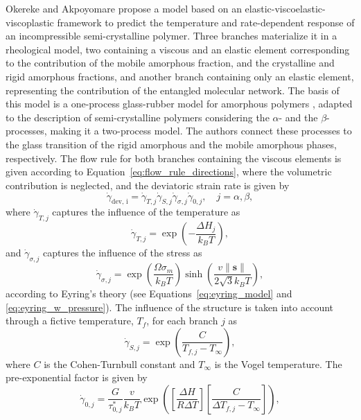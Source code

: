Okereke and Akpoyomare \citep{okerekeTwoprocessConstitutiveModel2019} propose a model based on an elastic-viscoelastic-viscoplastic framework to predict the temperature and rate-dependent response of an incompressible semi-crystalline polymer.
Three branches materialize it in a rheological model, two containing a viscous and an elastic element corresponding to the contribution of the mobile amorphous fraction, and the crystalline and rigid amorphous fractions, and another branch containing only an elastic element, representing the contribution of the entangled molecular network.
The basis of this model is a one-process glass-rubber model for amorphous polymers \citep{buckleyGlassrubberConstitutiveModel1995}, adapted to the description of semi-crystalline polymers considering the $\alpha$- and the $\beta$-processes, making it a two-process model.
The authors connect these processes to the glass transition of the rigid amorphous and the mobile amorphous phases, respectively.
The flow rule for both branches containing the viscous elements is given according to Equation~\eqref{eq:flow_rule_directions}, where the volumetric contribution is neglected, and the deviatoric strain rate is given by
\begin{equation}
	\dot \gamma_\text{dev, i} = \dot \gamma_{T,j}\dot\gamma_{S,j}\dot\gamma_{\sigma,j}\dot\gamma_{0,j},\quad j=\alpha, \beta,
\end{equation}
where $\dot \gamma_{T,j}$ captures the influence of the temperature as
\begin{equation}
	\dot \gamma_{T,j} = \exp\left(-\frac{\Delta H_j}{k_B T}\right),
\end{equation}
and $\dot \gamma_{\sigma,j}$ captures the influence of the stress as
\begin{equation}
	\dot\gamma_{\sigma,j} = \exp\left(\frac{\Omega\sigma_m}{k_B T}\right)\sinh\left(\frac{v\|\bm s\|}{2\sqrt{3}k_BT}\right),
\end{equation}
according to Eyring's theory (see Equations~\eqref{eq:eyring_model} and \eqref{eq:eyring_w_pressure}).
The influence of the structure is taken into account through a fictive temperature, $T_f$, for each branch $j$ as
\begin{equation}
	\dot\gamma_{S,j} = \exp\left(\frac{C}{T_{f,j}-T_\infty}\right),
\end{equation}
where $C$ is the Cohen-Turnbull constant and $T_\infty$ is the Vogel temperature.
The pre-exponential factor is given by
\begin{equation}
	\dot \gamma_{0,j} = \frac{G}{\tau^*_{0,j}} \frac{v}{k_B T}\exp\left(\left[\frac{\Delta H}{R\Delta T}\right]\left[\frac{C}{\Delta T_{f,j} - T_\infty}\right]\right),
\end{equation}
